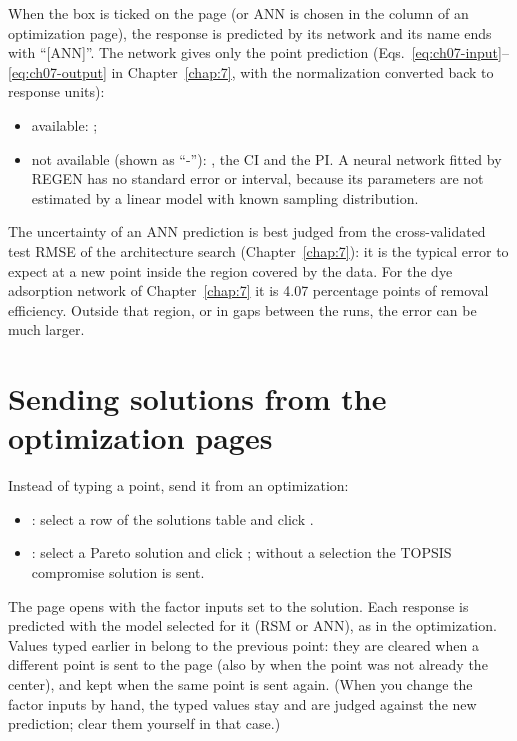 When the box  is ticked on the
 page (or ANN is chosen in the  column of an optimization page), the response is predicted by its
network and its name ends with ``[ANN]''. The network gives only the point prediction (Eqs.~\eqref{eq:ch07-input}--\eqref{eq:ch07-output} in
Chapter~\ref{chap:7}, with the normalization converted back to response units):
\begin{itemize}
  \item available: ;
  \item not available (shown as ``-''): , the CI and the PI. A neural network fitted by
    REGEN has no standard error or interval, because its parameters are not estimated by a linear model with known
    sampling distribution.
\end{itemize}
The uncertainty of an ANN prediction is best judged from the cross-validated test RMSE of the architecture search
(Chapter~\ref{chap:7}): it is the typical error to expect at a new point inside the region covered by the data. For the dye
adsorption network of Chapter~\ref{chap:7} it is 4.07 percentage points of removal efficiency. Outside that region, or in
gaps between the runs, the error can be much larger.

\section{Sending solutions from the optimization pages}\label{sec:ch10-send}

Instead of typing a point, send it from an optimization:
\begin{itemize}
  \item {}: select a row of the solutions table and click .
  \item {}: select a Pareto solution and click ; without a
    selection the TOPSIS compromise solution is sent.
\end{itemize}
The page opens with the factor inputs set to the solution. Each response is predicted with the model selected for
it (RSM or ANN), as in the optimization. Values typed earlier in  belong to the previous point:
they are cleared when a different point is sent to the page (also by  when the point was
not already the center), and kept when the same point is sent again. (When you
change the factor inputs by hand, the typed values stay and are judged against the new prediction; clear them
yourself in that case.)

